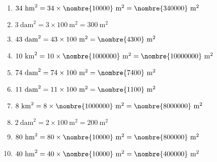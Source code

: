 \documentclass[a4paper,11pt,fleqn]{article}
\begin{document}
\begin{correction}
\exo{}

\begin{multicols}{2}
\begin{enumerate}
	\item $ 34~\text{hm}^2 =  34\times\nombre{10000}~\text{m}^2 = \nombre{340000}~\text{m}^2$
	\item $ 3~\text{dam}^2 =  3\times100~\text{m}^2 = 300~\text{m}^2$
	\item $ 43~\text{dam}^2 =  43\times100~\text{m}^2 = \nombre{4300}~\text{m}^2$
	\item $ 10~\text{km}^2 =  10\times\nombre{1000000}~\text{m}^2 = \nombre{10000000}~\text{m}^2$
	\item $ 74~\text{dam}^2 =  74\times100~\text{m}^2 = \nombre{7400}~\text{m}^2$
	\item $ 11~\text{dam}^2 =  11\times100~\text{m}^2 = \nombre{1100}~\text{m}^2$
	\item $ 8~\text{km}^2 =  8\times\nombre{1000000}~\text{m}^2 = \nombre{8000000}~\text{m}^2$
	\item $ 2~\text{dam}^2 =  2\times100~\text{m}^2 = 200~\text{m}^2$
	\item $ 80~\text{hm}^2 =  80\times\nombre{10000}~\text{m}^2 = \nombre{800000}~\text{m}^2$
	\item $ 40~\text{hm}^2 =  40\times\nombre{10000}~\text{m}^2 = \nombre{400000}~\text{m}^2$
\end{enumerate}
\end{multicols}

\exo{}


\end{correction}
\end{document}
